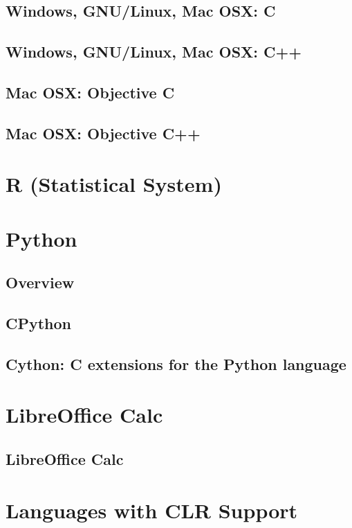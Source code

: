 \documentclass[12pt,a4paper,openany]{book}
\begin{document}
\section{Windows, GNU/Linux, Mac OSX: C}

\section{Windows, GNU/Linux, Mac OSX: C++}

\section{Mac OSX: Objective C}

\section{Mac OSX: Objective C++}

\chapter{R (Statistical System)}

\chapter{Python}

\section{Overview}

\section{CPython}

\section{Cython: C extensions for the Python language}

\chapter{LibreOffice Calc}

\section{LibreOffice Calc}

\chapter{Languages with CLR Support}
\end{document}
